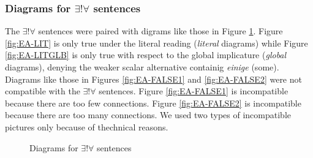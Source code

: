 \documentclass[a4paper,10pt]{article}
\begin{document}
\subsubsection{Diagrams for $\exists! \forall$ sentences}

The $\exists! \forall$ sentences were paired with digrams like those in Figure \ref{fig:EA}. Figure \ref{fig:EA-LIT} is only true under the literal reading ({\it literal} diagrams) while  Figure \ref{fig:EA-LITGLB} is only true with respect to the global implicature ({\it global} diagrams), denying the weaker scalar alternative containig {\it einige} (some). Diagrams like those in Figures \ref{fig:EA-FALSE1} and \ref{fig:EA-FALSE2} were not compatible with the $\exists! \forall$ sentences. Figure \ref{fig:EA-FALSE1} is incompatible because there are too few connections. Figure \ref{fig:EA-FALSE2} is incompatible because there are too many connections. We used two types of incompatible pictures only because of thechnical reasons.

\begin{figure}[ht]
\centering
{}
\caption[Optional caption for list of figures]{Diagrams for $\exists! \forall$ sentences}
\label{fig:EA}
\end{figure}
\end{document}
